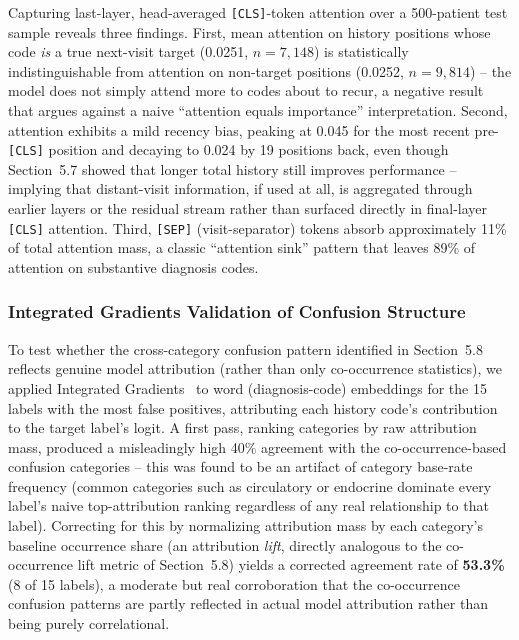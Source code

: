 \documentclass[11pt]{article}
\begin{document}
Capturing last-layer, head-averaged \texttt{[CLS]}-token attention over a
500-patient test sample reveals three findings. First, mean attention on
history positions whose code \emph{is} a true next-visit target (0.0251,
$n=7{,}148$) is statistically indistinguishable from attention on
non-target positions (0.0252, $n=9{,}814$) -- the model does not simply
attend more to codes about to recur, a negative result that argues against a
naive ``attention equals importance'' interpretation. Second, attention
exhibits a mild recency bias, peaking at 0.045 for the most recent
pre-\texttt{[CLS]} position and decaying to 0.024 by 19 positions back, even
though Section~5.7 showed that longer total history still improves
performance -- implying that distant-visit information, if used at all, is
aggregated through earlier layers or the residual stream rather than surfaced
directly in final-layer \texttt{[CLS]} attention. Third, \texttt{[SEP]}
(visit-separator) tokens absorb approximately 11\% of total attention mass, a
classic ``attention sink'' pattern that leaves 89\% of attention on
substantive diagnosis codes.

\subsubsection{Integrated Gradients Validation of Confusion Structure}

To test whether the cross-category confusion pattern identified in
Section~5.8 reflects genuine model attribution (rather than only co-occurrence
statistics), we applied Integrated
Gradients~\cite{sundararajan2017axiomatic} to word (diagnosis-code) embeddings
for the 15 labels with the most false positives, attributing each history
code's contribution to the target label's logit. A first pass, ranking
categories by raw attribution mass, produced a misleadingly high 40\%
agreement with the co-occurrence-based confusion categories -- this was found
to be an artifact of category base-rate frequency (common categories such as
circulatory or endocrine dominate every label's naive top-attribution ranking
regardless of any real relationship to that label). Correcting for this by
normalizing attribution mass by each category's baseline occurrence share
(an attribution \emph{lift}, directly analogous to the co-occurrence lift
metric of Section~5.8) yields a corrected agreement rate of \textbf{53.3\%}
(8 of 15 labels), a moderate but real corroboration that the co-occurrence
confusion patterns are partly reflected in actual model attribution rather
than being purely correlational.
\end{document}
